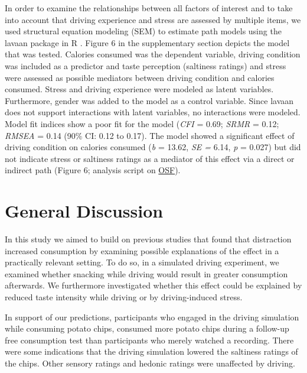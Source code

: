 \documentclass[authordate, empirical]{jote-new-article}
\begin{document}
In order to examine the relationships between all factors of interest and to take into account that driving experience and stress are assessed by multiple items, we used structural equation modeling (SEM) to estimate path models using the lavaan package in R \parencites{Rosseel2012}. Figure 6 in the supplementary section depicts the model that was tested. Calories consumed was the dependent variable, driving condition was included as a predictor and taste perception (saltiness ratings) and stress were assessed as possible mediators between driving condition and calories consumed. Stress and driving experience were modeled as latent variables. Furthermore, gender was added to the model as a control variable. Since lavaan does not support interactions with latent variables, no interactions were modeled. Model fit indices show a poor fit for the model (\emph{CFI} = 0.69; \emph{SRMR} = 0.12; \emph{RMSEA} = 0.14 (90\% CI: 0.12 to 0.17). The model showed a significant effect of driving condition on calories consumed (\emph{b }= 13.62, \emph{SE = }6.14, \emph{p }= 0.027) but did not indicate stress or saltiness ratings as a mediator of this effect via a direct or indirect path (Figure 6; analysis script on \href{https://osf.io/twg9r/}{OSF}).



\section{General Discussion}




In this study we aimed to build on previous studies that found that distraction increased consumption by examining possible explanations of the effect in a practically relevant setting. To do so, in a simulated driving experiment, we examined whether snacking while driving would result in greater consumption afterwards. We furthermore investigated whether this effect could be explained by reduced taste intensity while driving or by driving-induced stress.



In support of our predictions, participants who engaged in the driving simulation while consuming potato chips, consumed more potato chips during a follow-up free consumption test than participants who merely watched a recording. There were some indications that the driving simulation lowered the saltiness ratings of the chips. Other sensory ratings and hedonic ratings were unaffected by driving.
\end{document}
